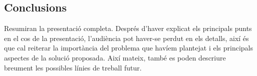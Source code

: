 \subsection{Conclusions} Resumiran la presentació completa. Després d'haver explicat els principals punts en el cos de la presentació, l'audiència pot haver-se perdut en els detalls, així és que cal reiterar la importància del problema que havíem plantejat i els principals aspectes de la solució proposada. Així mateix, també es poden descriure breument les possibles línies de treball futur.
